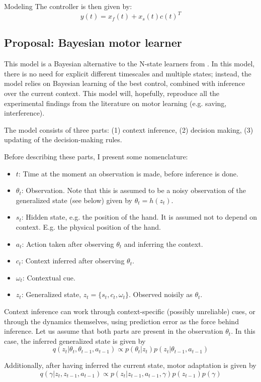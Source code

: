 \documentclass{report}
\begin{document}
\begin{chapter}{Modeling}
The controller is then given by:
\[
y(t) = x_f(t) + x_s(t)c(t)^T
\]

\subsection{Proposal: Bayesian motor learner}
\label{subsec:proposal}
This model is a Bayesian alternative to the N-state learners from
\cite{Lee_Dual_2009}. In this model, there is no need for explicit different
timescales and multiple states; instead, the model relies on Bayesian learning
of the best control, combined with inference over the current context. This
model will, hopefully, reproduce all the experimental findings from the
literature on motor learning (e.g. saving, interference).

The model consists of three parts: (1) context inference, (2) decision making,
(3) updating of the decision-making rules.

Before describing these parts, I present some nomenclature:
\begin{itemize}
\item $t$: Time at the moment an observation is made, before inference is done.
\item $\theta_t$: Observation. Note that this is assumed to be a noisy
observation of the generalized state (see below) given by $\theta_t = h(z_t)$.
\item $s_t$: Hidden state, e.g. the position of the hand. It is assumed not to
depend on context. E.g. the physical position of the hand.
\item $a_t$: Action taken after observing $\theta_t$ and inferring the context.
\item $c_t$: Context inferred after observing $\theta_t$.
\item $\omega_t$: Contextual cue.
\item $z_t$: Generalized state, $z_t = \{s_t, c_t, \omega_t\}$. Observed noisily
as $\theta_t$.
\end{itemize}

Context inference can work through context-specific (possibly unreliable) cues,
or through the dynamics themselves, using prediction error as the force behind
inference. Let us assume that both parts are present in the observation
$\theta_t$. In this case, the inferred generalized state is given by
\[
  q(z_t | \theta_t, \theta_{t-1}, a_{t-1}) \propto p(\theta_t | z_t)p(z_t|\theta_{t-1}, a_{t-1})
\]
  
Additionally, after having inferred the current state, motor adaptation is given by
\[
q(\gamma | z_t, z_{t-1}, a_{t-1}) \propto p(z_t | z_{t-1}, a_{t-1}, \gamma)p(z_{t-1})p(\gamma)
\]


\end{chapter}
\end{document}
